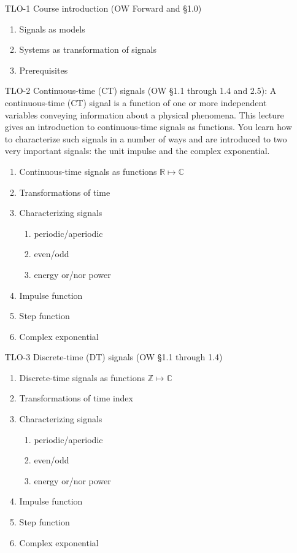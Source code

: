 \begin{enumerate}
\item[TLO-1] Course introduction (OW Forward and \S 1.0) %
  \begin{enumerate}
  \item Signals as models
  \item Systems as transformation of signals
  \item Prerequisites
  \end{enumerate}

\item[TLO-2] Continuous-time (CT) signals (OW \S 1.1 through 1.4 and 2.5): A continuous-time (CT) signal  is a function of one or more independent variables conveying information about a physical phenomena. This lecture gives an introduction to continuous-time signals as functions. You learn how to characterize such signals in a number of ways and are introduced to two very important signals: the unit impulse and the complex exponential.
  \begin{enumerate}
  \item Continuous-time signals as functions $\mathbb{R}\mapsto\mathbb{C}$
  \item Transformations of time
  \item Characterizing signals
    \begin{enumerate}
    \item periodic/aperiodic
    \item even/odd
    \item energy or/nor power
    \end{enumerate}
  \item Impulse function
  \item Step function
  \item Complex exponential
  \end{enumerate}

\item[TLO-3] Discrete-time (DT) signals (OW \S 1.1 through 1.4)
  \begin{enumerate}
  \item Discrete-time signals as functions $\mathbb{Z}\mapsto\mathbb{C}$
  \item Transformations of time index
  \item Characterizing signals
    \begin{enumerate}
    \item periodic/aperiodic
    \item even/odd
    \item energy or/nor power
    \end{enumerate}
  \item Impulse function
  \item Step function
  \item Complex exponential
  \end{enumerate}


\end{enumerate}
